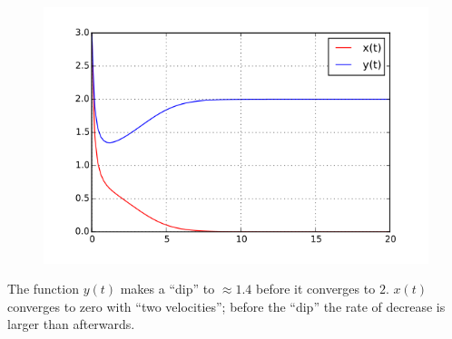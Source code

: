 \begin{figure}[H]
\includegraphics[scale=0.7]{images/strogatz_1_4.png}
\end{figure}

The function $y(t)$ makes a ``dip'' to $\approx 1.4$ before it converges to $2$. $x(t)$ converges to zero with ``two velocities''; before the ``dip'' the rate of decrease is larger than afterwards.
